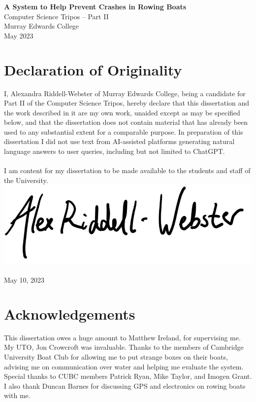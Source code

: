 \documentclass[12pt,a4paper]{report}
\begin{document}
\thispagestyle{empty}


\vspace*{60mm}
\begin{center}
\Huge
\textbf{A System to Help Prevent Crashes in Rowing Boats} \\[5mm]
Computer Science Tripos -- Part II \\[5mm]
Murray Edwards College \\[5mm]
May 2023
\end{center}

\pagestyle{plain}
\chapter*{Declaration of Originality}

I, Alexandra Riddell-Webster of Murray Edwards College, being a candidate for Part II of the Computer Science Tripos, hereby declare that this dissertation and the work described in it are my own work, unaided except as may be specified below, and that the dissertation does not contain material that has already been used to any substantial extent for a comparable purpose. In preparation of this dissertation I did not use text from AI-assisted platforms generating natural language answers to user queries, including but not limited to ChatGPT.\\ \\
I am content for my dissertation to be made available to the students and staff of the University. \\

\bigskip
{}
\includegraphics[scale=0.35]{sig.jpg} \\
 \\ 
May 10, 2023

\chapter*{Acknowledgements}
This dissertation owes a huge amount to Matthew Ireland, for supervising me. My UTO, Jon Crowcroft was invaluable. Thanks to the members of Cambridge University Boat Club for allowing me to put strange boxes on their boats, advising me on communication over water and helping me evaluate the system. Special thanks to CUBC members Patrick Ryan, Mike Taylor,  and Imogen Grant. I also thank Duncan Barnes for discussing GPS and electronics on rowing boats with me.
\end{document}
